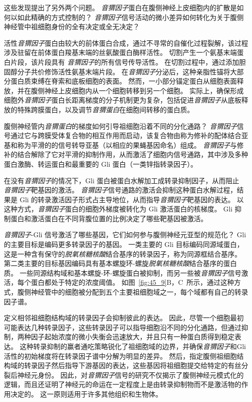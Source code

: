 这些发现提出了另外两个问题。
\textit{音猬因子}蛋白在腹侧神经上皮细胞内的扩散是如何以如此精确的方式控制的？
\textit{音猬因子}信号活动的微小差异如何转化为关于腹侧神经管中祖细胞身份的全有决定或全无决定？


活性\textit{音猬因子}蛋白由较大的前体蛋白合成，通过不寻常的自催化过程裂解，该过程涉及驻留在前体蛋白羧基末端的丝氨酸蛋白酶样活性。
切割产生一个氨基末端蛋白片段，该片段具有 \textit{音猬因子}的所有信号传导活性。
在切割过程中，通过添加胆固醇分子共价修饰活性氨基末端片段。
在\textit{音猬因子}分泌后，这种亲脂性锚将大部分蛋白质束缚在脊索和底板细胞的表面。
然而，一小部分锚定蛋白从细胞表面释放，并在腹侧神经上皮细胞内从一个细胞转移到另一个细胞。
实际上，确保形成细胞外\textit{音猬因子}蛋白长距离梯度的分子机制更为复杂，包括促进\textit{音猬因子}从底板释放的特殊跨膜蛋白，以及调节\textit{音猬蛋白}在细胞间转移的蛋白质。


腹侧神经管内\textit{音猬蛋白}的梯度如何引导祖细胞沿着不同的分化通路？
\textit{音猬因子}信号通过它与跨膜受体复合物的相互作用而启动，该复合物由称为修补的配体结合亚基和称为平滑的的信号转导亚基（以相应的果蝇基因命名）组成。
\textit{音猬因子}与修补的结合解除了它对平滑的抑制作用，从而激活了细胞内信号通路，其中涉及多种蛋白激酶、转运蛋白和最重要的 Gli 蛋白（一类锌指转录因子）。


在没有\textit{音猬因子}的情况下，Gli 蛋白被蛋白水解加工成转录抑制因子，从而阻止 \textit{音猬因子}靶基因的激活。
\textit{音猬因子}信号通路的激活会抑制这种蛋白水解过程，结果是 Gli 的转录激活因子形式占主导地位，从而指导\textit{音猬因子}靶基因的表达。
以这种方式，\textit{音猬因子}蛋白的细胞外梯度被转化为 Gli 激活蛋白的核梯度。
Gli 抑制蛋白和激活蛋白在不同背腹位置的比例决定了哪些靶基因被激活。


\textit{音猬因子}-Gli 信号激活了哪些基因，它们如何参与腹侧神经元亚型的规范化？
Gli 的主要目标是编码更多转录因子的基因。
一类主要的 Gli 目标编码同源域蛋白，这是一种含有保守的\textit{脱氧核糖核酸}结合基序的转录因子，称为同源框结合基序。
第二类主要的目标基因编码具有基本螺旋环-螺旋\textit{脱氧核糖核酸}结合基序的蛋白质。
一些同源结构域和基本螺旋-环-螺旋蛋白被抑制，而另一些被\textit{音猬因子}信号激活，每个蛋白都处于特定的浓度阈值。
如图~\ref{fig:45_9}B，C~所示，通过这种方式，腹侧神经管中的细胞被分配到五个主要祖细胞域之一，每个域都有自己的转录因子谱。


定义相邻祖细胞结构域的转录因子会抑制彼此的表达。
因此，尽管一个细胞最初可能表达几种转录因子，这些转录因子可以指导细胞沿不同的分化通路，但通过抑制，两种因子起始浓度的微小失衡会迅速放大，并且只有一种蛋白质得到稳定表达。
这种转录抑制的赢者通吃策略锐化了祖细胞域的边界，并确保\textit{音猬因子}和Gli活性的初始梯度将在转录因子谱中分解为明显的差异。
然后，指定腹侧祖细胞结构域的转录因子然后指导下游基因的表达，这些基因将祖细胞提交给特定的有丝分裂后神经元身份。
因此，对\textit{音猬因子}信号的研究不仅揭示了腹侧神经元模式化的逻辑，而且还证明了神经元的命运在一定程度上是由转录抑制物而不是激活物的作用决定的。
这一原则适用于许多其他组织和生物体。


